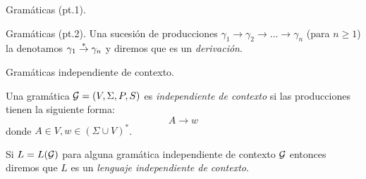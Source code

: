 \documentclass[aspectratio=169, 11pt]{beamer}
\begin{document}
	\begin{frame}[fragile]{Gramáticas (pt.1).}
		
	\end{frame}
	
	\begin{frame}[fragile]{Gramáticas (pt.2).}
		Una sucesión de producciones $\gamma_{1} \to \gamma_{2} \to \dots \to \gamma_{n}$ (para $n \ge 1$) la denotamos $\gamma_{1} \overset{*}{\to} \gamma_{n}$ y diremos que es un \emph{derivación}.

		\medskip 

	\end{frame}

	\begin{frame}{Gramáticas independiente de contexto.}
		\begin{deff}
			Una gramática ${\cal G} = (V, \Sigma, P, S) $ es \emph{independiente de contexto} si las producciones tienen la siguiente forma:
			\begin{equation*}
				A \to w
			\end{equation*}
			donde $A \in V, w \in (\Sigma \cup V)^*$.  
			
			Si $L=L({\cal G})$ para alguna gramática independiente de contexto $\cal G$ entonces diremos que $L$ es un \emph{lenguaje independiente de contexto}.

		\end{deff}
	\end{frame}
\end{document}
